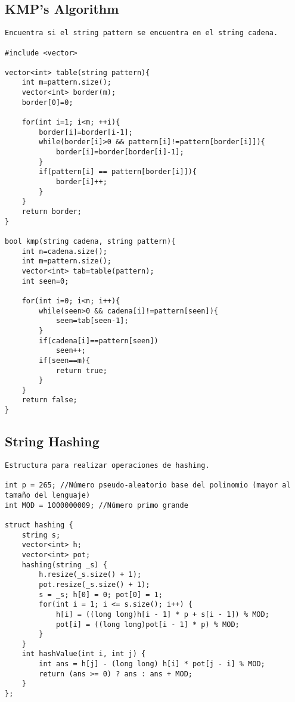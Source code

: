 \documentclass[10pt,letterpaper,twocolumn,twosided]{article}
\begin{document}
\subsection{KMP's Algorithm}
\begin{lstlisting}
Encuentra si el string pattern se encuentra en el string cadena.

#include <vector>

vector<int> table(string pattern){
	int m=pattern.size();
	vector<int> border(m);
	border[0]=0;

	for(int i=1; i<m; ++i){
		border[i]=border[i-1];
		while(border[i]>0 && pattern[i]!=pattern[border[i]]){
			border[i]=border[border[i]-1];
		}
		if(pattern[i] == pattern[border[i]]){
			border[i]++;
		}
	}
	return border;
}

bool kmp(string cadena, string pattern){
	int n=cadena.size();
	int m=pattern.size();
	vector<int> tab=table(pattern);
	int seen=0;

	for(int i=0; i<n; i++){
		while(seen>0 && cadena[i]!=pattern[seen]){
			seen=tab[seen-1];
		}
		if(cadena[i]==pattern[seen])
			seen++;
		if(seen==m){
			return true;
		}
	}
	return false;
}
\end{lstlisting}

\subsection{String Hashing}
\begin{lstlisting}
Estructura para realizar operaciones de hashing. 

int p = 265; //Número pseudo-aleatorio base del polinomio (mayor al tamaño del lenguaje)
int MOD = 1000000009; //Número primo grande

struct hashing {
	string s;
	vector<int> h;
	vector<int> pot;
	hashing(string _s) {
		h.resize(_s.size() + 1);
		pot.resize(_s.size() + 1);
		s = _s; h[0] = 0; pot[0] = 1;
		for(int i = 1; i <= s.size(); i++) {
			h[i] = ((long long)h[i - 1] * p + s[i - 1]) % MOD;
			pot[i] = ((long long)pot[i - 1] * p) % MOD;
		}
	}
	int hashValue(int i, int j) {
		int ans = h[j] - (long long) h[i] * pot[j - i] % MOD;
		return (ans >= 0) ? ans : ans + MOD;
	}
};\end{lstlisting}
\end{document}
